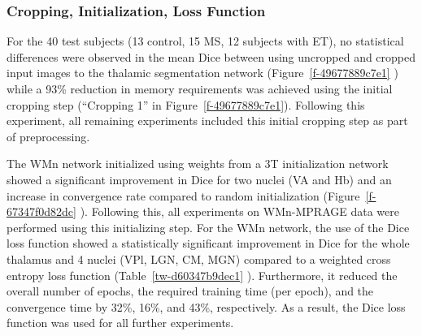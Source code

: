 \documentclass[3p,,final,12pt]{elsarticle}
\begin{document}
\subsubsection{Cropping, Initialization, Loss Function }For the 40 test subjects (13 control, 15 MS, 12 subjects with ET), no statistical differences were observed in the mean Dice between using uncropped and cropped input images to the thalamic segmentation network (Figure~\ref{f-49677889c7e1} ) while a 93\% reduction in memory requirements was achieved using the initial cropping step (``Cropping 1'' in Figure~\ref{f-49677889c7e1}). Following this experiment, all remaining experiments included this initial cropping step as part of preprocessing. 

The WMn network initialized using weights from a 3T initialization network showed a significant improvement in Dice for two nuclei (VA and Hb) and an increase in convergence rate compared to random initialization (Figure~\ref{f-67347f0d82dc} ). Following this, all experiments on WMn-MPRAGE data were performed using this initializing step. For the WMn network, the use of the Dice loss function showed a statistically significant improvement in Dice for the whole thalamus and 4 nuclei (VPl, LGN, CM, MGN) compared to a weighted cross entropy loss function (Table~\ref{tw-d60347b9dec1} ). Furthermore, it reduced the overall number of epochs, the required training time (per epoch), and the convergence time by 32\%, 16\%, and 43\%, respectively. As a result, the Dice loss function was used for all further experiments. 
\end{document}
